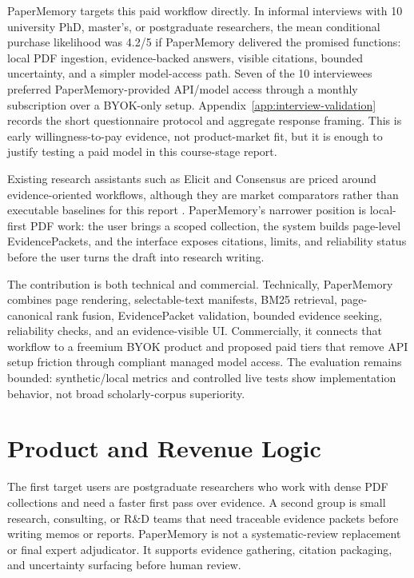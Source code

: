 \documentclass{article}
\begin{document}
PaperMemory targets this paid workflow directly. In informal interviews with 10 university PhD, master's, or postgraduate researchers, the mean conditional purchase likelihood was 4.2/5 if PaperMemory delivered the promised functions: local PDF ingestion, evidence-backed answers, visible citations, bounded uncertainty, and a simpler model-access path. Seven of the 10 interviewees preferred PaperMemory-provided API/model access through a monthly subscription over a BYOK-only setup. Appendix~\ref{app:interview-validation} records the short questionnaire protocol and aggregate response framing. This is early willingness-to-pay evidence, not product-market fit, but it is enough to justify testing a paid model in this course-stage report.

Existing research assistants such as Elicit and Consensus are priced around evidence-oriented workflows, although they are market comparators rather than executable baselines for this report \citep{elicitPricing,consensusPricing}. PaperMemory's narrower position is local-first PDF work: the user brings a scoped collection, the system builds page-level EvidencePackets, and the interface exposes citations, limits, and reliability status before the user turns the draft into research writing.




The contribution is both technical and commercial. Technically, PaperMemory combines page rendering, selectable-text manifests, BM25 retrieval, page-canonical rank fusion, EvidencePacket validation, bounded evidence seeking, reliability checks, and an evidence-visible UI. Commercially, it connects that workflow to a freemium BYOK product and proposed paid tiers that remove API setup friction through compliant managed model access. The evaluation remains bounded: synthetic/local metrics and controlled live tests show implementation behavior, not broad scholarly-corpus superiority.

\section{Product and Revenue Logic}

The first target users are postgraduate researchers who work with dense PDF collections and need a faster first pass over evidence. A second group is small research, consulting, or R\&D teams that need traceable evidence packets before writing memos or reports. PaperMemory is not a systematic-review replacement or final expert adjudicator. It supports evidence gathering, citation packaging, and uncertainty surfacing before human review.
\end{document}
